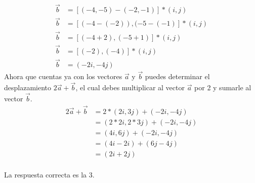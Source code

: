 \documentclass[11pt, a4paper]{article} %
\theoremstyle{dotlessP}
\theoremstyle{dotlessS}
\begin{document}
\begin{enumerate}[label=\color{dg}\theenumi.]
\begin{align*}
\vec{b} &=[(-4, -5)-(-2, -1)]*(i,j)
\\
\vec{b} &=[(-4-(-2)),(-5-(-1)]*(i,j)
\\
\vec{b} &=[(-4+2),(-5+1)]*(i,j)
\\
\vec{b} &=[(-2),(-4)]*(i,j)
\\
\vec{b} &=(-2i,-4j)
\end{align*}
Ahora que cuentas ya con los vectores \(\vec {a}\) y \(\vec {b}\) puedes determinar el desplazamiento \(2 \vec{a} + \vec {b}\), el cual debes multiplicar al vector \(\vec {a}\) por 2 y sumarle al vector \(\vec {b}\).
\begin{align*}
2 \vec{a} + \vec{b} &=2*(2i,3j) + (-2i,-4j)
\\
&=(2*2i,2*3j) + (-2i,-4j)
\\
&=(4i,6j) + (-2i,-4j)
\\
&=(4i-2i) + (6j-4j)
\\
&=(2i + 2j)
\end{align*}
\\
{\color{dh} La respuesta correcta es la 3.}
\\
\end{enumerate}
\end{document}
